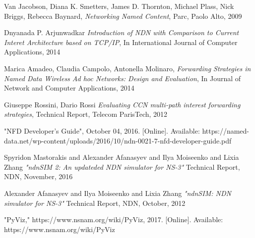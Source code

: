 

\begin{thebibliography}{99}

  Van Jacobson, Diana K. Smetters, James D. Thornton, Michael Plass, Nick Briggs, Rebecca Baynard,
  \textit{Networking Named Content},
  Parc, Paolo Alto, 2009
  
  Dnyanada P. Arjunwadkar
  \textit{Introduction of NDN with Comparison to Current Interet Architecture based on TCP/IP},
  In International Journal of Computer Applications, 2014

  Marica Amadeo, Claudia Campolo, Antonella Molinaro,
  \textit{Forwarding Strategies in Named Data Wireless Ad hoc Networks: Design and Evaluation},
  In Journal of Network and Computer Applications, 2014
  
  Giuseppe Rossini, Dario Rossi
  \textit{Evaluating CCN multi-path interest forwarding strategies},
  Technical Report, Telecom ParisTech, 2012
  
  "NFD Developer's Guide", October 04, 2016. [Online]. Available: {https://named-data.net/wp-content/uploads/2016/10/ndn-0021-7-nfd-developer-guide.pdf}

  Spyridon Mastorakis and Alexander Afanasyev and Ilya Moiseenko and Lixia Zhang
  \textit{"ndnSIM 2: An updateded NDN simulator for NS-3"}
  Technical Report, NDN, November, 2016


  Alexander Afanasyev and Ilya Moiseenko and Lixia Zhang
  \textit{"ndnSIM: NDN simulator for NS-3"}
  Technical Report, NDN, October, 2012


  "PyViz,"
  https://www.nsnam.org/wiki/PyViz, 2017. [Online]. Available: https://www.nsnam.org/wiki/PyViz
  


\end{thebibliography}
